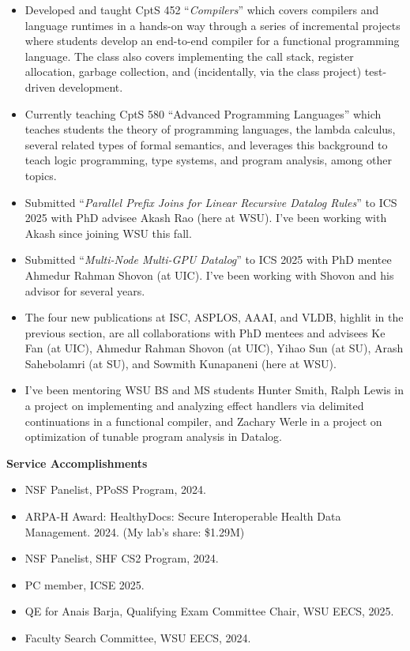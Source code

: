 \documentclass[line]{res}
\begin{document}
\begin{itemize}
  \item Developed and taught CptS 452 ``\emph{Compilers}'' which covers compilers and language runtimes in a hands-on way through a series of incremental projects where students develop an end-to-end compiler for a functional programming language. The class also covers implementing the call stack, register allocation, garbage collection, and (incidentally, via the class project) test-driven development.
  \item Currently teaching CptS 580 ``Advanced Programming Languages'' which teaches students the theory of programming languages, the lambda calculus, several related types of formal semantics, and leverages this background to teach logic programming, type systems, and program analysis, among other topics.
  \item Submitted ``\emph{Parallel Prefix Joins for Linear Recursive Datalog Rules}'' to ICS 2025 with PhD advisee Akash Rao (here at WSU). I've been working with Akash since joining WSU this fall.
  \item Submitted ``\emph{Multi-Node Multi-GPU Datalog}'' to ICS 2025 with PhD mentee Ahmedur Rahman Shovon (at UIC). I've been working with Shovon and his advisor for several years.
  \item The four new publications at ISC, ASPLOS, AAAI, and VLDB, highlit in the previous section, are all collaborations with PhD mentees and advisees Ke Fan (at UIC), Ahmedur Rahman Shovon (at UIC), Yihao Sun (at SU), Arash Sahebolamri (at SU), and Sowmith Kunapaneni (here at WSU).
  \item I've been mentoring WSU BS and MS students Hunter Smith, Ralph Lewis in a project on implementing and analyzing effect handlers via delimited continuations in a functional compiler, and Zachary Werle in a project on optimization of tunable program analysis in Datalog.
\end{itemize}

\textbf{Service Accomplishments}

\begin{itemize}
    \item NSF Panelist, PPoSS Program, 2024.
    \item ARPA-H Award: HealthyDocs: Secure Interoperable Health Data Management. 2024. (My lab's share: \$1.29M)
    \item NSF Panelist, SHF CS2 Program, 2024.
    \item PC member, ICSE 2025.
    \item QE for Anais Barja, Qualifying Exam Committee Chair, WSU EECS, 2025.
    \item Faculty Search Committee, WSU EECS, 2024.
\end{itemize}
\end{document}
